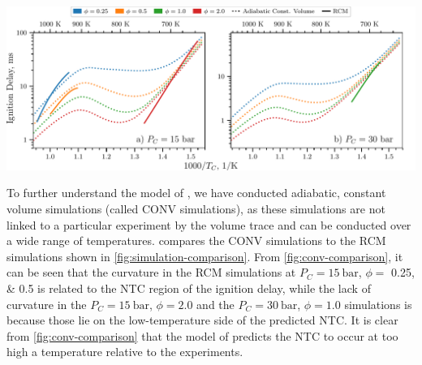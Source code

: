 \documentclass[letterpaper, review, sort&compress]{elsarticle}
\begin{document}
\begin{center}
    \captionsetup{type=figure}
    \includegraphics[width=\textwidth]{figures/constant-volume-comparison.pdf}
    \caption{Comparison of simulated ignition delays computed in an adiabatic, constant volume
    system (dotted lines) and computed using the procedure described in
    \cref{sec:experimental-modeling} (solid lines). a) \SI{15}{\bar}, b) \SI{30}{\bar}.}
    \label{fig:conv-comparison}
\end{center}

To further understand the model of \citet{Dievart2013}, we have conducted adiabatic, constant volume
simulations (called CONV simulations), as these simulations are not linked to a particular
experiment by the volume trace and can be conducted over a wide range of temperatures.
 compares the CONV simulations to the RCM simulations shown in
\cref{fig:simulation-comparison}. From \cref{fig:conv-comparison}, it can be seen that the curvature
in the RCM simulations at $P_C = \SI{15}{\bar}$, $\phi =$ \numlist{0.25;0.5} is related to the NTC
region of the ignition delay, while the lack of curvature in the $P_C = \SI{15}{\bar}$, $\phi =
\num{2.0}$ and the $P_C = \SI{30}{\bar}$, $\phi = \num{1.0}$ simulations is because those lie on the
low-temperature side of the predicted NTC. It is clear from \cref{fig:conv-comparison} that the
model of \citet{Dievart2013} predicts the NTC to occur at too high a temperature relative to the
experiments.
\end{document}

